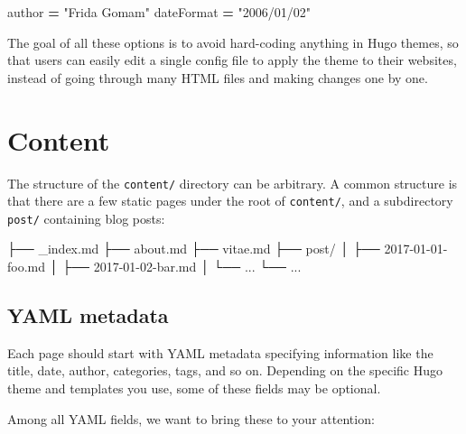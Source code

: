 \documentclass[12pt,]{krantz}
\makeatletter
\newenvironment{Shaded}{\begin{snugshade}}{\end{snugshade}}
\newcommand{\StringTok}[1]{\textcolor[rgb]{0.31,0.60,0.02}{#1}}
\newcommand{\OperatorTok}[1]{\textcolor[rgb]{0.81,0.36,0.00}{\textbf{#1}}}
\newcommand{\ExtensionTok}[1]{#1}
\newcommand{\NormalTok}[1]{#1}
\newenvironment{kframe}{%
\medskip{}
\setlength{\fboxsep}{.8em}
 \def\at@end@of@kframe{}%
 \ifinner\ifhmode%
  \def\at@end@of@kframe{\end{minipage}}%
  \begin{minipage}{\columnwidth}%
 \fi\fi%
 \def\FrameCommand##1{\hskip\@totalleftmargin \hskip-\fboxsep
 \colorbox{shadecolor}{##1}\hskip-\fboxsep
     \hskip-\linewidth \hskip-\@totalleftmargin \hskip\columnwidth}%
 \MakeFramed {\advance\hsize-\width
   \@totalleftmargin\z@ \linewidth\hsize
   \@setminipage}}%
 {\par\unskip\endMakeFramed%
 \at@end@of@kframe}
\renewenvironment{Shaded}{\begin{kframe}}{\end{kframe}}
\theoremstyle{definition}
\theoremstyle{definition}
\theoremstyle{definition}
\theoremstyle{remark}
\makeatother
\begin{document}
\begin{Shaded}
\begin{Highlighting}[]
\NormalTok{[params]}
\NormalTok{    author }\OperatorTok{=} \StringTok{"Frida Gomam"}
\NormalTok{    dateFormat }\OperatorTok{=} \StringTok{"2006/01/02"}
\end{Highlighting}
\end{Shaded}

The goal of all these options is to avoid hard-coding anything in Hugo
themes, so that users can easily edit a single config file to apply the
theme to their websites, instead of going through many HTML files and
making changes one by one.

\section{Content}\label{content}

The structure of the \texttt{content/} directory can be arbitrary. A
common structure is that there are a few static pages under the root of
\texttt{content/}, and a subdirectory \texttt{post/} containing blog
posts:

\begin{Shaded}
\begin{Highlighting}[]
\NormalTok{├── }\ExtensionTok{_index.md}
\NormalTok{├── }\ExtensionTok{about.md}
\NormalTok{├── }\ExtensionTok{vitae.md}
\NormalTok{├── }\ExtensionTok{post/}
\NormalTok{│   ├── }\ExtensionTok{2017-01-01-foo.md}
\NormalTok{│   ├── }\ExtensionTok{2017-01-02-bar.md}
\NormalTok{│   └── }\ExtensionTok{...}
\NormalTok{└── }\ExtensionTok{...}
\end{Highlighting}
\end{Shaded}

\subsection{YAML metadata}\label{yaml-metadata}

Each page should start with YAML metadata specifying
information like the title, date, author, categories, tags, and so on.
Depending on the specific Hugo theme and templates you use, some of
these fields may be optional.

Among all YAML fields, we want to bring these to your attention:
\end{document}
